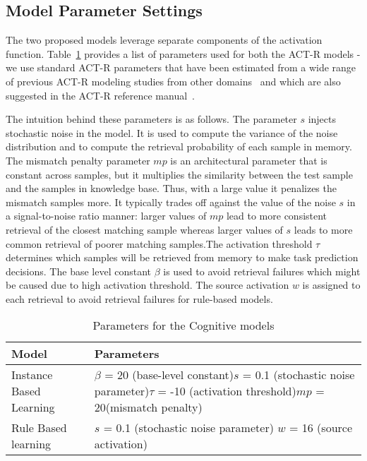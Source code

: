 \documentclass[conference]{IEEEtran}
\begin{document}
\subsection{Model Parameter Settings}
The two proposed models leverage separate components of the activation function.  Table~\ref{paramTable} provides a list of parameters used for both the ACT-R models - we use standard ACT-R parameters that have been estimated from a wide range of previous ACT-R modeling studies from other domains~\cite{parameters} and which are also suggested in the ACT-R reference manual~\cite{actr}. 

The intuition behind these parameters is as follows. The parameter $s$ injects stochastic noise in the model. It is used to compute the variance of the noise distribution and to compute the retrieval probability of each sample in memory. The mismatch penalty parameter $mp$ is an architectural parameter that is constant across samples, but it multiplies the similarity between the test sample and the samples in knowledge base.  Thus, with a large value it penalizes the mismatch samples more. It typically trades off against the value of the noise $s$ in a signal-to-noise ratio manner: larger values of $mp$ lead to more consistent retrieval of the closest matching sample whereas larger values of $s$ leads to more common retrieval of poorer matching samples.The activation threshold $\tau$ determines which samples will be retrieved from memory to make task prediction decisions. The base level constant $\beta$ is used to avoid retrieval failures which might be caused due to high activation threshold. The source activation $w$ is assigned to each retrieval to avoid retrieval failures for rule-based models.
\vspace{-1em}
\begin{table}[h!]
	\caption{\textmd{Parameters for the Cognitive models}}
	\label{paramTable}
	\centering
	\renewcommand{\arraystretch}{1.5}
	
	\begin{tabular}{|p{2.2cm}|p{5cm}|} 
		\hline
		{\bf Model} &  {\bf Parameters} \\ \hline 
		Instance Based Learning & $\beta$ = 20 (base-level constant)\newline $s$ = 0.1 (stochastic noise parameter)\newline $\tau$ = -10 (activation threshold)\newline $mp$ = 20(mismatch penalty) \\  \hline
		Rule Based learning & $s$ = 0.1 (stochastic noise parameter) \newline $w$ = 16 (source activation) \\ 
		
		\hline
	\end{tabular}
	\vspace{-1em}
	
\end{table}
\end{document}
